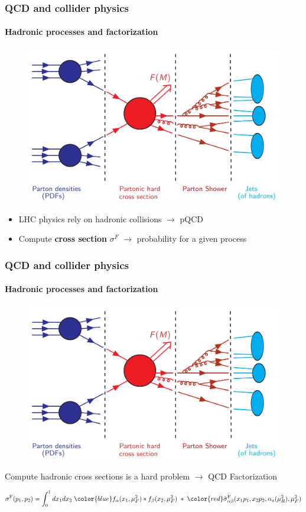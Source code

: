 \documentclass[aspectratio=43]{beamer}
\begin{document}
\begin{frame}
	
	\frametitle{QCD and collider physics}
	\framesubtitle{Hadronic processes and factorization}
	
	\footnotesize
	
	\vspace{0.4 cm}
	
	\begin{figure}
		\includegraphics[width = 7 cm]{plots/part1/chapter2/factorization_1.png}
	\end{figure}
	
	\begin{itemize}
		\item LHC physics rely on hadronic collisions $\longrightarrow$ pQCD
		\item Compute \textbf{cross section} $\sigma^{F}$ $\longrightarrow$ probability for a given process
	\end{itemize}

\end{frame}

\begin{frame}

	\frametitle{QCD and collider physics}
	\framesubtitle{Hadronic processes and factorization}
	
	\footnotesize
	
	\vspace{0.4 cm}
	
	\begin{figure}
		\includegraphics[width = 7 cm]{plots/part1/chapter2/factorization_1.png}
	\end{figure}
	
	Compute hadronic cross sections is a {\color{red}hard problem} $\longrightarrow$ {\color{blue} QCD Factorization}
	
	\begin{equation}
		\sigma^{\textrm{F}}(p_{1}, p_{2}) =
		\int_{0}^{1} dx_{1} dx_{2} \; {\color{blue} f_{\alpha}(x_{1}, \mu_{F}^{2}) \ast f_{\beta}(x_{2}, \mu_{F}^{2})}
		\; \ast \;  
		{\color{red}\hat{\sigma}^{\textrm{F}}_{\alpha \beta}(x_{1}p_{1}, x_{2}p_{2}, \alpha_{s}(\mu_{R}^{2}), \mu_{F}^{2})} \nonumber
	\end{equation}

\end{frame}
\end{document}
